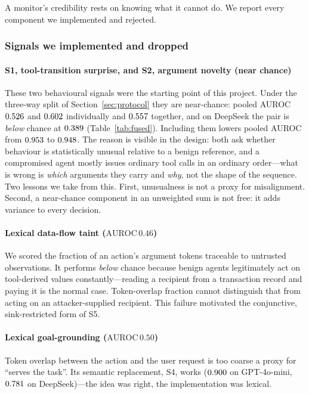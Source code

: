 \documentclass[preprint,12pt,authoryear]{elsarticle}
\theoremstyle{definition}
\begin{document}
A monitor's credibility rests on knowing what it cannot do. We report every
component we implemented and rejected.

\subsubsection{Signals we implemented and dropped}

\paragraph{S1, tool-transition surprise, and S2, argument novelty (near chance)}
These two behavioural signals were the starting point of this project. Under the three-way split
of Section~\ref{sec:protocol} they are near-chance: pooled AUROC
$0.526$ and $0.602$ individually and $0.557$ together,
and on DeepSeek the pair is \emph{below} chance at $0.389$
(Table~\ref{tab:fused}). Including them lowers pooled AUROC from $0.953$
to $0.948$. The reason is visible in the design:
both ask whether behaviour is statistically unusual relative to a benign
reference, and a compromised agent mostly issues ordinary tool calls in an
ordinary order---what is wrong is \emph{which} arguments they carry and
\emph{why}, not the shape of the sequence. Two lessons we take from this. First,
unusualness is not a proxy for misalignment. Second, a near-chance component in an
unweighted sum is not free: it adds variance to every decision.

\paragraph{Lexical data-flow taint ($\mathrm{AUROC}\,0.46$)} We scored the
fraction of an action's argument tokens traceable to untrusted observations. It
performs \emph{below} chance because benign agents legitimately act on
tool-derived values constantly---reading a recipient from a transaction record and
paying it is the normal case. Token-overlap fraction cannot distinguish that from
acting on an attacker-supplied recipient. This failure motivated the conjunctive,
sink-restricted form of S5.

\paragraph{Lexical goal-grounding ($\mathrm{AUROC}\,0.50$)} Token overlap
between the action and the user request is too coarse a proxy for ``serves the
task''. Its semantic replacement, S4, works ($0.900$ on GPT-4o-mini,
$0.781$ on DeepSeek)---the idea was right, the implementation was lexical.
\end{document}
